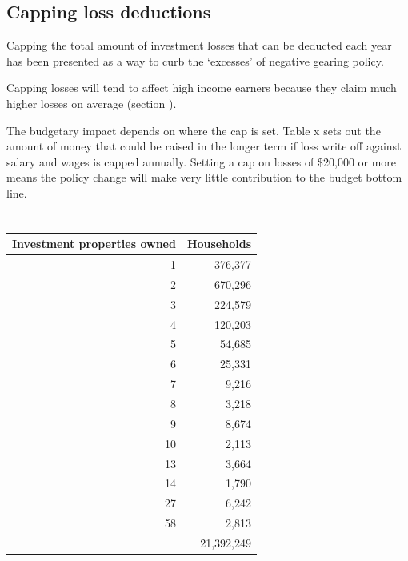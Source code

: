 \documentclass{grattan}\usepackage[]{graphicx}\usepackage[]{color}
\begin{document}
\subsection{Capping loss deductions}

Capping the total amount of investment losses that can be deducted each
year has been presented as a way to curb the `excesses' of negative
gearing policy.

Capping losses will tend to affect high income earners because they
claim much higher losses on average (section ).

The budgetary impact depends on where the cap is set. Table x sets out
the amount of money that could be raised in the longer term if loss
write off against salary and wages is capped annually. Setting a cap on
losses of \$20,000 or more means the policy change will make very little
contribution to the budget bottom line.






\section{}

\begin{table}[!h]
\begin{center}
\begin{tabularx}{\linewidth}{rr}
  \toprule
{\textbf{Investment properties owned}} & {\textbf{Households}} \\ 
  \midrule
  1 & 376,377 \\ 
    2 & 670,296 \\ 
    3 & 224,579 \\ 
    4 & 120,203 \\ 
    5 & 54,685 \\ 
    6 & 25,331 \\ 
    7 & 9,216 \\ 
    8 & 3,218 \\ 
    9 & 8,674 \\ 
   10 & 2,113 \\ 
   13 & 3,664 \\ 
   14 & 1,790 \\ 
   27 & 6,242 \\ 
   58 & 2,813 \\ 
   & 21,392,249 \\ 
   \bottomrule
\end{tabularx}

\end{center}
\end{table}
\end{document}
